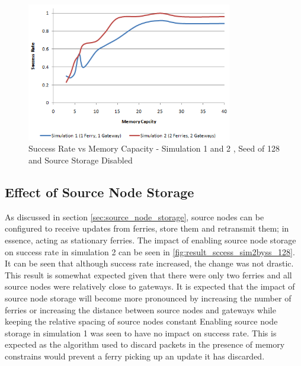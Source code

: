 \begin{figure}[htbp]
    \centering
    \includegraphics[width=0.8\textwidth]{images/result_sccess_bothsim_128_dss}
    \caption{Success Rate vs Memory Capacity - Simulation 1 and 2 , Seed of 128 and Source Storage Disabled}
    \label{fig:result_sccess_bothsim_128_dss}
\end{figure}

\subsection{Effect of Source Node Storage}

As discussed in section \ref{sec:source_node_storage}, source nodes can be configured to receive updates from ferries, store them and retransmit them; in essence, acting as stationary ferries.
The impact of enabling source node storage on success rate in simulation 2 can be seen in \ref{fig:result_sccess_sim2byss_128}.
It can be seen that although success rate increased, the change was not drastic.
This result is somewhat expected given that there were only two ferries and all source nodes were relatively close to gateways.
It is expected that the impact of source node storage will become more pronounced by increasing the number of ferries or increasing the distance between source nodes and gateways while keeping the relative spacing of source nodes constant
Enabling source node storage in simulation 1 was seen to have no impact on success rate.
This is expected as the algorithm used to discard packets in the presence of memory constrains would prevent a ferry picking up an update it has discarded.



